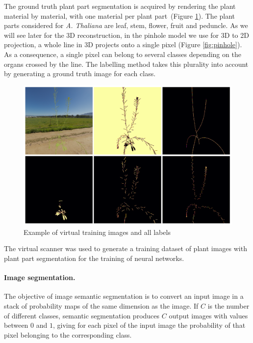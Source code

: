 The ground truth plant part segmentation is acquired by rendering the plant material by material, with one material per
plant part~(Figure \ref{fig:plants}). The
plant parts considered for \emph{A. Thaliana} are leaf, stem, flower,
fruit and peduncle. As we will see later for the 3D reconstruction, in the pinhole model \cite{sturm_pinhole_2014} we use for 3D to 2D
projection, a whole line in 3D projects onto a single pixel (Figure
\ref{fig:pinhole}). As a consequence, a single pixel can belong to
several classes depending on the organs crossed by the line. The
labelling method takes this plurality into account by generating a
ground truth image for each class.

\begin{figure}[h]
    \centering \includegraphics[width = 0.9\linewidth]{figures/Images_and_labels.png}
    \caption{Example of virtual training images and all labels}
    \label{fig:plants}
\end{figure}

The virtual scanner was used to generate a training dataset of plant
images with plant part segmentation 
for the training of neural networks.


\paragraph{Image segmentation.} The objective of image semantic segmentation is
to convert an input image in a stack of probability maps of the same
dimension as the image. If $C$ is the number of different classes,
semantic segmentation produces $C$ output images with values between $0$ and $1$,
giving for each pixel of the input image the probability of that pixel
belonging to the corresponding class.

